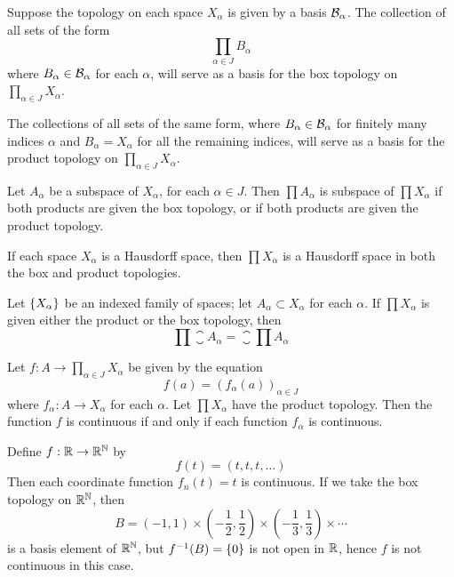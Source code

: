 \documentclass[12pt,a4paper]{article}
\begin{document}
    \begin{thm}
        Suppose the topology on each space $X_\alpha$ is given by a basis $\mathcal{B}_\alpha$. The collection of all sets of the form
        $$
        \prod_{\alpha\in J} B_\alpha
        $$
        where $B_\alpha\in\mathcal{B}_\alpha$ for each $\alpha$, will serve as a basis for the box topology on $\prod_{\alpha\in J}X_\alpha$.

        The collections of all sets of the same form, where $B_\alpha\in\mathcal{B}_\alpha$ for finitely many indices $\alpha$ and $B_\alpha=X_\alpha$ for all the remaining indices, will serve as a basis for the product topology on $\prod_{\alpha\in J}X_\alpha$.
    \end{thm}
    \hfill

    \begin{thm}
        Let $A_\alpha$ be a subspace of $X_\alpha$, for each $\alpha\in J$. Then $\prod A_\alpha$ is subspace of $\prod X_\alpha$ if both products are given the box topology, or if both products are given the product topology.
    \end{thm}
    \hfill

    \begin{thm}
        If each space $X_\alpha$ is a Hausdorff space, then $\prod X_\alpha$ is a Hausdorff space in both the box and product topologies.
    \end{thm}
    \hfill

    \begin{thm}
        Let $\left\{X_\alpha\right\}$ be an indexed family of spaces; let $A_\alpha\subset X_\alpha$ for each $\alpha$. If $\prod X_\alpha$ is given either the product or the box topology, then
        $$
        \prod \closure{A_\alpha}=\closure{\prod A_\alpha}
        $$
    \end{thm}
    \hfill

    \begin{thm}\label{2.8.10}
        Let $f:A\to\prod_{\alpha\in J}X_\alpha$ be given by the equation
        $$
        f(a)=(f_\alpha(a))_{\alpha\in J}
        $$
        where $f_\alpha:A\to X_\alpha$ for each $\alpha$. Let $\prod X_\alpha$ have the product topology. Then the function $f$ is continuous if and only if each function $f_\alpha$ is continuous.
    \end{thm}
    \begin{remark}
        Define $f:\mathbb{R}\to\mathbb{R}^{\mathbb{N}}$ by
        $$
        f(t)=(t,t,t,\dots)
        $$
        Then each coordinate function $f_n(t)=t$ is continuous. If we take the box topology on $\mathbb{R}^{\mathbb{N}}$, then 
        $$
        B=(-1,1)\times\left(-\frac{1}{2},\frac{1}{2}\right)\times\left(-\frac{1}{3},\frac{1}{3}\right)\times\cdots
        $$
        is a basis element of $\mathbb{R}^{\mathbb{N}}$, but $f^{-1}(B)=\left\{0\right\}$ is not open in $\mathbb{R}$, hence $f$ is not continuous in this case. 
    \end{remark}
    \hfill
\end{document}

